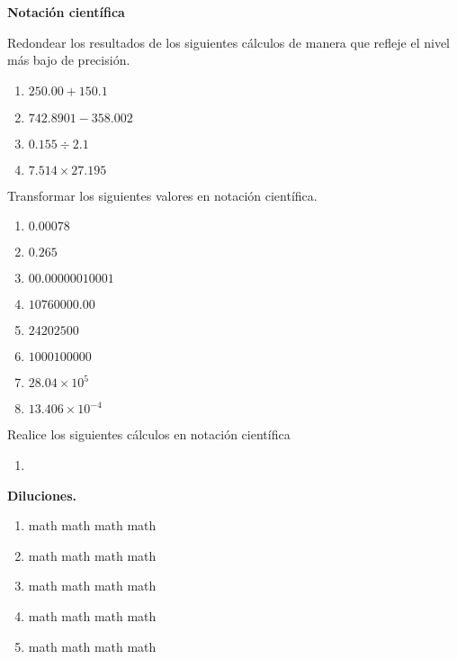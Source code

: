 \documentclass[12pt,a4paper]{article}
\newcommand{\sect}[1]{
	\begin{tcolorbox}[colframe= white,top=2pt, bottom=2pt, colback = gris]
	 \textbf{#1} %
    \end{tcolorbox}
 }
\begin{document}
\begin{multicols}{2}
    \raggedcolumns
    
\sect{Notaci\'on cient\'ifica}

\begin{Exercice} Redondear los resultados de los siguientes c\'alculos de manera que refleje el nivel m\'as bajo de precisi\'on.
	
	\begin{enumerate}[1)]
		\item $250.00 + 150.1$
		\item $742.8901 - 358.002$
		\item $0.155 \div 2.1$
		\item $7.514 \times 27.195$
	\end{enumerate}
	
\end{Exercice}
    
\begin{Exercice} Transformar los siguientes valores en notaci\'on cient\'ifica.
     	
\begin{enumerate}[1)]
	\item $0.00078$
	\item $0.265$	
	\item $00.00000010001$
	\item $10760000.00$
	\item $24202500$
	\item $1000100000$
	\item $28.04 \times 10^{5}$
	\item $13.406 \times 10^{-4}$
\end{enumerate}

\end{Exercice}

\begin{Exercice} Realice los siguientes c\'alculos en notaci\'on cient\'ifica 
	
	\begin{enumerate}[1)]
		\item 
	\end{enumerate}

\end{Exercice}

    \sect{Diluciones.}

\begin{Exercice}
	
\begin{enumerate}[label=\textbf{\color{gris}\arabic*.}]
    \item math math math math
    \item math math math math
    \item math math math math
    \item math math math math
    \item math math math math
    

\end{enumerate}
\end{Exercice}
\end{multicols}
\end{document}
